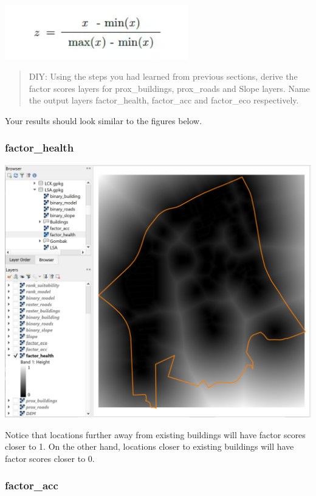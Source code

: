\documentclass[
  letterpaper,
  DIV=11,
  numbers=noendperiod]{scrreprt}
\begin{document}
\includegraphics[width=0.6\textwidth,height=\textheight]{./img08/image13.jpg}

\begin{quote}
DIY: Using the steps you had learned from previous sections, derive the
factor scores layers for prox\_buildings, prox\_roads and Slope layers.
Name the output layers factor\_health, factor\_acc and factor\_eco
respectively.
\end{quote}

Your results should look similar to the figures below.

\hypertarget{factor_health}{%
\subsubsection{factor\_health}\label{factor_health}}

\includegraphics{./img08/image14.jpg}

Notice that locations further away from existing buildings will have
factor scores closer to 1. On the other hand, locations closer to
existing buildings will have factor scores closer to 0.

\hypertarget{factor_acc}{%
\subsubsection{factor\_acc}\label{factor_acc}}
\end{document}
